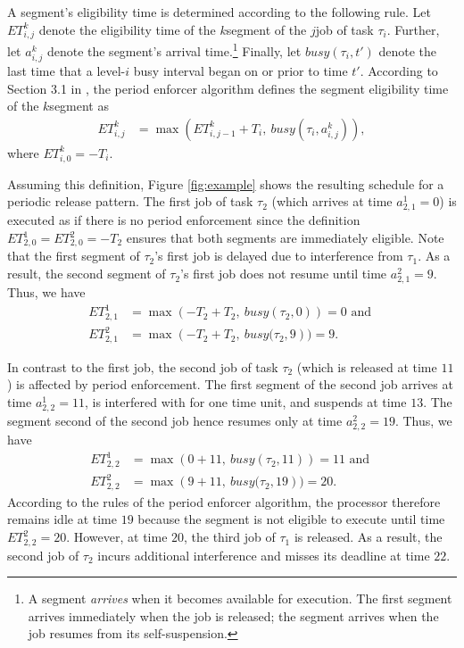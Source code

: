 A segment's eligibility time is determined according to the following rule. Let $ET_{i,j}^k$ denote the eligibility time of the $k$\xth segment of the $j$\xth job of task $\tau_i$. Further, let $a^k_{i,j}$ denote the segment's arrival time.\footnote{A segment \emph{arrives} when it becomes available for execution. The first segment arrives immediately when the job is released; the segment arrives when the job resumes from its self-suspension.} Finally, let $\mathit{busy}(\tau_i, t')$ denote the last time that a level-$i$ busy interval began on or prior to time $t'$. According to Section 3.1 in \cite{Raj:suspension1991}, the period enforcer algorithm defines the segment eligibility time of the $k$\xth segment as
\begin{align}\label{eq:ET-def}
	ET_{i,j}^k & = \max\left(ET_{i,j-1}^k + T_i,\ \mathit{busy}(\tau_i, a^k_{i,j})\right),
\end{align}
where $ET_{i,0}^k = -T_i$. 

Assuming this definition, Figure \ref{fig:example} shows the resulting schedule for a periodic release pattern. The first job of task $\tau_2$ (which arrives at time $a^1_{2,1} =  0$) is executed as if there is no period enforcement since the definition $ET_{2,0}^1 = ET_{2,0}^2 = -T_2$ ensures that both segments are immediately eligible. Note that the first segment of $\tau_2$'s first job is delayed due to interference from $\tau_1$. As a result, the second segment of $\tau_2$'s first job does not resume until time $a^2_{2,1} = 9$. Thus, we have
\begin{align*}
	ET_{2,1}^1 & = \max\left(-T_2 + T_2,\ \mathit{busy}(\tau_2, 0)\right) = 0  \text{ and }
\\
	ET_{2,1}^2 & = \max\left(-T_2 + T_2,\ \mathit{busy}(\tau_2, 9\right) ) = 9.
\end{align*}

In contrast to the first job, the second job of task $\tau_2$ (which is released at time $11$) is affected by period enforcement. The first segment of the second job arrives at time $a^1_{2,2} = 11$, is interfered with for one time unit, and suspends at time $13$. The segment second of the second job hence resumes only at time $a^2_{2,2} = 19$. Thus, we have
\begin{align*}
	ET_{2,2}^1 & = \max\left(0 + 11,\ \mathit{busy}(\tau_2, 11)\right) = 11  \text{ and }
\\
	ET_{2,2}^2 & = \max\left(9 + 11,\ \mathit{busy}(\tau_2, 19\right) ) = 20.
\end{align*}
According to the rules of the period enforcer algorithm, the processor therefore remains idle at time $19$ because the segment is not eligible to execute until time $ET_{2,2}^2 = 20$. However, at time $20$, the third job of $\tau_1$ is released. As a result, the second job of $\tau_2$ incurs additional interference and misses its deadline at time $22$.




